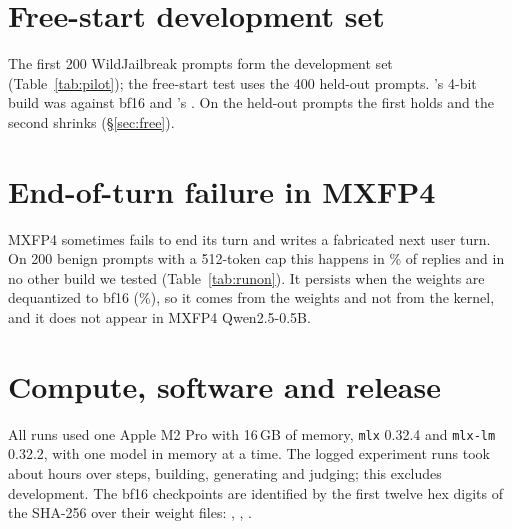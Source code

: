 \section{Free-start development set}
\label{app:pilot}
The first 200 WildJailbreak prompts form the development set (Table~\ref{tab:pilot}); the free-start test uses the 400 held-out prompts. \llama's 4-bit build was \pp{} against bf16 and \qwenthree's \pp. On the held-out prompts the first holds and the second shrinks (\S\ref{sec:free}).

\begin{table}[t]
\centering\small

\caption{Free-start development set, 200 prompts. No correction is applied.}
\label{tab:pilot}
\end{table}

\section{End-of-turn failure in MXFP4 \qwen}
\label{app:runon}
MXFP4 \qwen{} sometimes fails to end its turn and writes a fabricated next user turn. On 200 benign prompts with a 512-token cap this happens in \% of replies and in no other build we tested (Table~\ref{tab:runon}). It persists when the weights are dequantized to bf16 (\%), so it comes from the weights and not from the kernel, and it does not appear in MXFP4 Qwen2.5-0.5B.

\begin{table}[t]
\centering\small

\caption{Share (\%) of replies to 200 benign prompts that contain a fabricated next turn (512-token cap). ``--'': not built for that model.}
\label{tab:runon}
\end{table}

\section{Compute, software and release}
\label{app:compute}
All runs used one Apple M2 Pro with 16\,GB of memory, \texttt{mlx} 0.32.4 and \texttt{mlx-lm} 0.32.2, with one model in memory at a time. The logged experiment runs took about  hours over  steps, building, generating and judging; this excludes development. The bf16 checkpoints are identified by the first twelve hex digits of the SHA-256 over their weight files: \qwen{} \texttt{}, \llama{} \texttt{}, \qwenthree{} \texttt{}.

